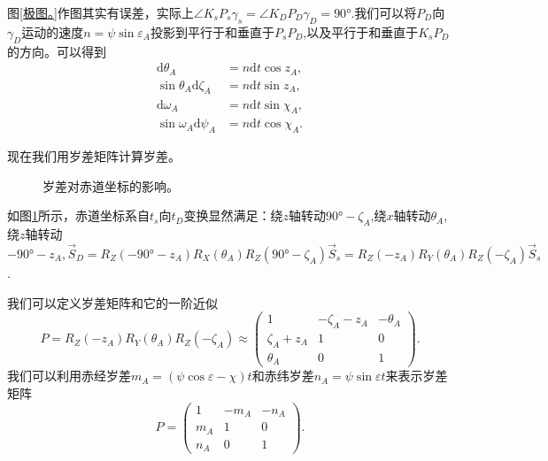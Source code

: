 \documentclass[11pt, a4paper, oneside]{ctexart}
\numberwithin{equation}{subsection}
\begin{document}
图\ref{极图。}作图其实有误差，实际上$\angle{K_{s}P_{s}\gamma_{s}}=\angle{K_{D}P_{D}\gamma_{D}}=\ang{90;;}$.我们可以将$P_{D}$向$\gamma_{D}$运动的速度$n=\psi\sin\varepsilon_{A}$投影到平行于和垂直于$P_{s}P_{D}$,以及平行于和垂直于$K_{s}P_{D}$的方向。可以得到
\begin{align}
\mathrm{d}\theta_{A}&=n\mathrm{d}t\cos z_{A},\\
\sin\theta_{A}\mathrm{d}\zeta_{A}&=n\mathrm{d}t\sin z_{A},\\
\mathrm{d}\omega_{A}&=n\mathrm{d}t\sin\chi_{A},\\
\sin\omega_{A}\mathrm{d}\psi_{A}&=n\mathrm{d}t\cos\chi_{A}.
\end{align}

现在我们用岁差矩阵计算岁差。
\begin{figure}[!htp]
\centering
{}
\captionsetup{justification=raggedright, singlelinecheck=false}
\caption{岁差对赤道坐标的影响。}
\label{岁差对赤道坐标的影响。}
\end{figure}

如图\ref{岁差对赤道坐标的影响。}所示，赤道坐标系自$t_{s}$向$t_{D}$变换显然满足：绕$z$轴转动$\ang{90;;}-\zeta_{A}$,绕$x$轴转动$\theta_{A}$,绕$z$轴转动$-\ang{90;;}-z_{A},\vec{S}_{D}=R_{Z}\left(-\ang{90;;}-z_{A}\right)R_{X}\left(\theta_{A}\right)R_{Z}\left(\ang{90;;}-\zeta_{A}\right)\vec{S}_{s}=R_{Z}\left(-z_{A}\right)R_{Y}\left(\theta_{A}\right)R_{Z}\left(-\zeta_{A}\right)\vec{S}_{s}$.

我们可以定义岁差矩阵和它的一阶近似
\begin{equation}
P=R_Z\left(-z_A\right)R_Y\left(\theta_A\right)R_Z\left(-\zeta_A\right)\approx\begin{pmatrix}
1 & -\zeta_A-z_A & -\theta_A\\
\zeta_A+z_A & 1 & 0\\
\theta_A & 0 & 1
\end{pmatrix}.
\end{equation}
我们可以利用赤经岁差$m_{A}=\left(\psi\cos\varepsilon-\chi\right)t$和赤纬岁差$n_{A}=\psi\sin\varepsilon t$来表示岁差矩阵
\begin{equation}
P=\begin{pmatrix}
1 & -m_{A} & -n_{A}\\
m_{A} & 1 & 0\\
n_A & 0 & 1
\end{pmatrix}.
\end{equation}
\end{document}
